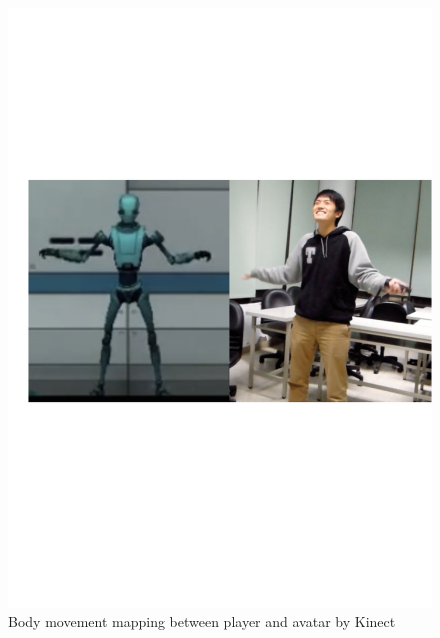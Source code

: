 \begin{figure}[!b]
\centering
\includegraphics[width=0.9\columnwidth]{Figures/GD_F3.pdf}
\caption{Body movement mapping between player and avatar by Kinect}
\label{fig:GD_F3}
\end{figure}


